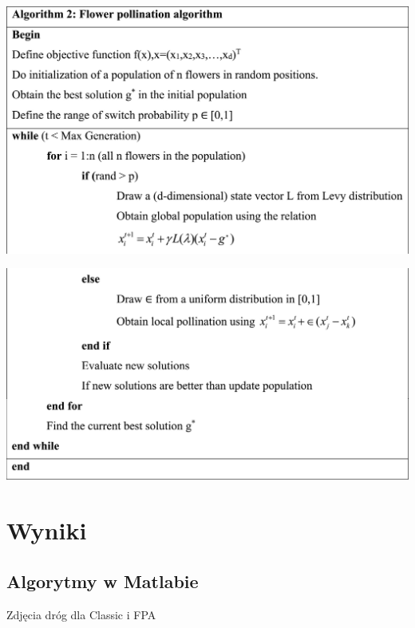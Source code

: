 \documentclass[aspectratio=169,15pt,]{beamer}
\begin{document}
\begin{frame}
\includegraphics[width =\textwidth,height=\textheight]{Obrazy/Pseudo2.jpg}
\end{frame}
\begin{frame}
\includegraphics[width =\textwidth,height=\textheight]{Obrazy/Pseudo3.jpg}
\end{frame}
\section{Wyniki}
\begin{frame}
	\sectionpage
\end{frame}
\subsection{Algorytmy w Matlabie}
\begin{frame}
	\subsectionpage
\end{frame}
\begin{frame}
Zdjęcia dróg dla Classic i FPA
\end{frame}
\end{document}
